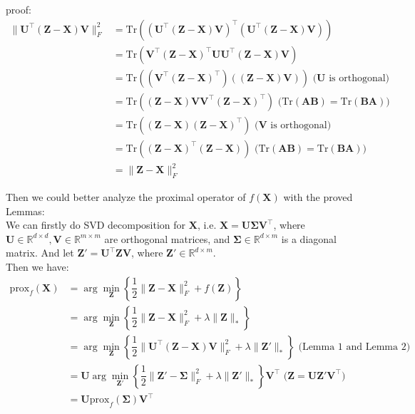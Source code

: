 proof:
\begin{align*}
    \|\mathbf{U}^{\top}(\mathbf{Z}-\mathbf{X})\mathbf{V}\|_F^2
    &= \text{Tr}\left((\mathbf{U}^{\top}(\mathbf{Z}-\mathbf{X})\mathbf{V})^{\top}(\mathbf{U}^{\top}(\mathbf{Z}-\mathbf{X})\mathbf{V})\right) \\
    &= \text{Tr}\left(\mathbf{V}^{\top}(\mathbf{Z}-\mathbf{X})^{\top}\mathbf{U}\mathbf{U}^{\top}(\mathbf{Z}-\mathbf{X})\mathbf{V}\right) \\
    &= \text{Tr}\left((\mathbf{V}^{\top}(\mathbf{Z}-\mathbf{X})^{\top})((\mathbf{Z}-\mathbf{X})\mathbf{V})\right) \text{ \ \ \ \ \ ($\mathbf{U}$ is orthogonal)} \\
    &= \text{Tr}\left((\mathbf{Z}-\mathbf{X})\mathbf{V}\mathbf{V}^{\top}(\mathbf{Z}-\mathbf{X})^{\top}\right) \text{ \ \ \ \ \ \ \ \ \ \ ($\text{Tr}(\mathbf{AB})=\text{Tr}(\mathbf{BA})$)} \\
    &= \text{Tr}\left((\mathbf{Z}-\mathbf{X})(\mathbf{Z}-\mathbf{X})^{\top}\right) \text{ \ \ \ \ \ \ \ \ \ \ \ \ \ \ \ \ \ ($\mathbf{V}$ is orthogonal)} \\
    &= \text{Tr}\left((\mathbf{Z}-\mathbf{X})^{\top}(\mathbf{Z}-\mathbf{X})\right) \text{ \ \ \ \ \ \ \ \ \ \ \ \ \ \ \ \ \ ($\text{Tr}(\mathbf{AB})=\text{Tr}(\mathbf{BA})$)} \\
    &= \|\mathbf{Z}-\mathbf{X}\|_F^2
\end{align*}

Then we could better analyze the proximal operator of $f(\mathbf{X})$ with the proved Lemmas:\\
We can firstly do SVD decomposition for $\mathbf{X}$, i.e. $\mathbf{X}=\mathbf{U}\mathbf{\Sigma}\mathbf{V}^{\top}$, where $\mathbf{U}\in \mathbb{R}^{d\times d},\mathbf{V}\in \mathbb{R}^{m\times m}$ are orthogonal matrices, and $\mathbf{\Sigma}\in \mathbb{R}^{d\times m}$ is a diagonal matrix. And let $\mathbf{Z}'=\mathbf{U}^{\top}\mathbf{Z}\mathbf{V}$, where $\mathbf{Z}'\in \mathbb{R}^{d\times m}$.\\
Then we have:
\begin{align*}
    \text{prox}_{f}(\mathbf{X}) &= \arg\min\limits_{\mathbf{Z}}\left\{\dfrac{1}{2}\|\mathbf{Z}-\mathbf{X}\|_F^2+f(\mathbf{Z})\right\} \\
    &= \arg\min\limits_{\mathbf{Z}}\left\{\dfrac{1}{2}\|\mathbf{Z}-\mathbf{X}\|_F^2+\lambda\|\mathbf{Z}\|_*\right\} \\
    &= \arg\min\limits_{\mathbf{Z}}\left\{\dfrac{1}{2}\|\mathbf{U}^{\top}(\mathbf{Z}-\mathbf{X})\mathbf{V}\|_F^2+\lambda\|\mathbf{Z}'\|_*\right\} \text{\ \ \ (Lemma 1 and Lemma 2)} \\
    &= \mathbf{U}\arg\min\limits_{\mathbf{Z}'}\left\{\dfrac{1}{2}\|\mathbf{Z}'-\mathbf{\Sigma}\|_F^2+\lambda\|\mathbf{Z}'\|_*\right\}\mathbf{V}^{\top} \text{\ \ \ \ ($\mathbf{Z}=\mathbf{U}\mathbf{Z}'\mathbf{V}^{\top})$} \\
    &= \mathbf{U}\text{prox}_{f}(\mathbf{\Sigma})\mathbf{V}^{\top}
\end{align*}

